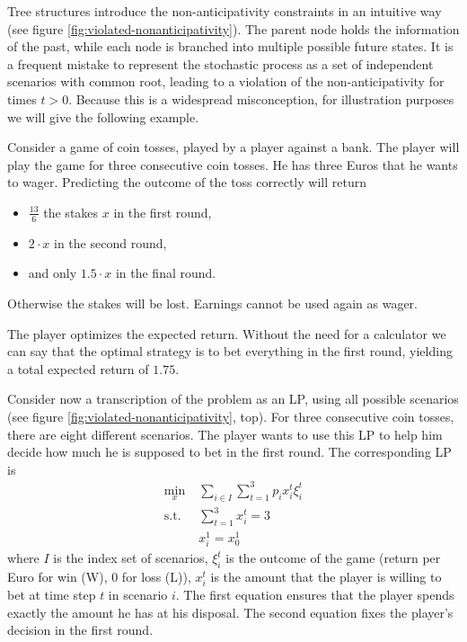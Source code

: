 Tree structures introduce the non-anticipativity constraints in an intuitive way (see figure \ref{fig:violated-nonanticipativity}).
The parent node holds the information of the past, while each node is branched into multiple possible future states.
It is a frequent mistake to represent the stochastic process as a set of independent scenarios with common root, leading to a violation of the non-anticipativity for times $t>0$.
Because this is a widespread misconception, for illustration purposes we will give the following example.
\begin{example}
  \label{ex:tree-necessity}
  Consider a game of coin tosses, played by a player against a bank.
  The player will play the game for three consecutive coin tosses.
  He has three Euros that he wants to wager.
  Predicting the outcome of the toss correctly will return
  \begin{itemize}
  \item $\frac{13}{6}$ the stakes $x$ in the first round,
  \item $2\cdot x$ in the second round,
  \item and only $1.5\cdot x$ in the final round.
  \end{itemize}
  Otherwise the stakes will be lost.
  Earnings cannot be used again as wager.

  The player optimizes the expected return.
  Without the need for a calculator we can say that the optimal strategy is to bet everything in the first round, yielding a total expected return of $1.75$.

  Consider now a transcription of the problem as an LP, using all possible scenarios (see figure \ref{fig:violated-nonanticipativity}, top).
  For three consecutive coin tosses, there are eight different scenarios.
  The player wants to use this LP to help him decide how much he is supposed to bet in the first round.
  The corresponding LP is
  \begin{align*}
    \min\limits_x &\; \sum_{i\in I}\sum_{t=1}^3p_ix_i^t \xi_i^t\\
    \text{s.t.} &\; \sum_{t=1}^3x_i^t = 3 \\
    & \; x_i^1 = x_0^1
  \end{align*}
  where $I$ is the index set of scenarios, $\xi_i^t$ is the outcome of the game (return per Euro for win (W), $0$ for loss (L)), $x_i^t$ is the amount that the player is willing to bet at time step $t$ in scenario $i$. The first equation ensures that the player spends exactly the amount he has at his disposal. The second equation fixes the player's decision in the first round.


\end{example}
